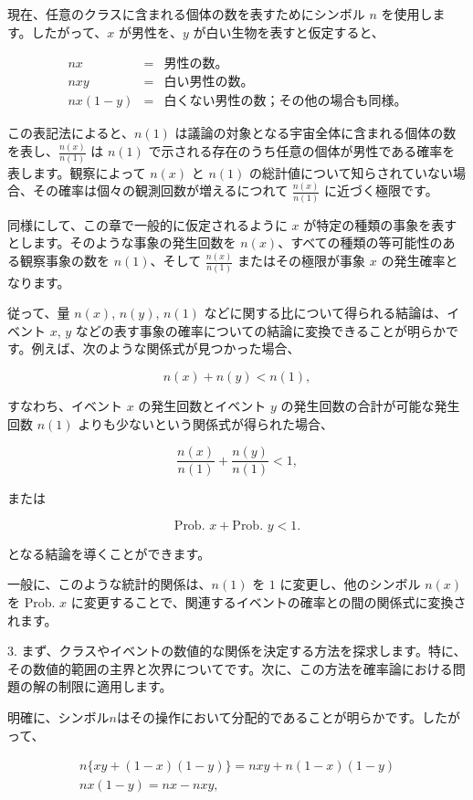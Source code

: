 \documentclass[a4paper,11pt,openany]{ltjsbook}
\begin{document}
現在、任意のクラスに含まれる個体の数を表すためにシンボル $n$ を使用します。したがって、$x$ が男性を、$y$ が白い生物を表すと仮定すると、

\[
\begin{array}{cccccc}
nx &=& \text{男性の数。}\\
nxy &=& \text{白い男性の数。}\\
nx(1-y) &=& \text{白くない男性の数；その他の場合も同様。}
\end{array}
\]

この表記法によると、$n(1)$ は議論の対象となる宇宙全体に含まれる個体の数を表し、$\frac{n(x)}{n(1)}$ は $n(1)$ で示される存在のうち任意の個体が男性である確率を表します。観察によって $n(x)$ と $n(1)$ の総計値について知らされていない場合、その確率は個々の観測回数が増えるにつれて $\frac{n(x)}{n(1)}$ に近づく極限です。

同様にして、この章で一般的に仮定されるように $x$ が特定の種類の事象を表すとします。そのような事象の発生回数を $n(x)$、すべての種類の等可能性のある観察事象の数を $n(1)$、そして $\frac{n(x)}{n(1)}$ またはその極限が事象 $x$ の発生確率となります。

従って、量 $n(x)$, $n(y)$, $n(1)$ などに関する比について得られる結論は、イベント $x$, $y$ などの表す事象の確率についての結論に変換できることが明らかです。例えば、次のような関係式が見つかった場合、

\[
n(x) + n(y) < n(1),
\]

すなわち、イベント $x$ の発生回数とイベント $y$ の発生回数の合計が可能な発生回数 $n(1)$ よりも少ないという関係式が得られた場合、

\[
\frac{n(x)}{n(1)} + \frac{n(y)}{n(1)} < 1,
\]

または

\[
\text{Prob. } x + \text{Prob. } y < 1.
\]

となる結論を導くことができます。

一般に、このような統計的関係は、$n(1)$ を $1$ に変更し、他のシンボル $n(x)$ を Prob. $x$ に変更することで、関連するイベントの確率との間の関係式に変換されます。

3. まず、クラスやイベントの数値的な関係を決定する方法を探求します。特に、その数値的範囲の主界と次界についてです。次に、この方法を確率論における問題の解の制限に適用します。

明確に、シンボル$n$はその操作において分配的であることが明らかです。したがって、

\begin{gather*}
n\{xy + (1-x)(1-y)\} = nxy + n(1-x)(1-y)\\
nx(1-y) = nx - nxy,
\end{gather*}
\end{document}
